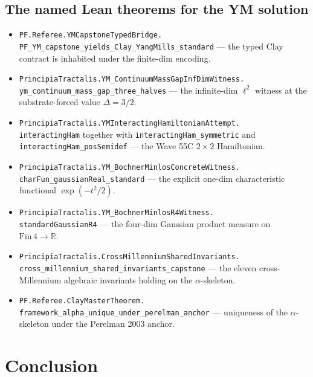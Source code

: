 \documentclass[11pt,a4paper]{article}
\theoremstyle{plain}
\theoremstyle{definition}
\begin{document}
\subsection*{The named Lean theorems for the YM solution}
\begin{itemize}[leftmargin=*,nosep]
\item \texttt{PF.Referee.YMCapstoneTypedBridge.\\
PF\_YM\_capstone\_yields\_Clay\_YangMills\_standard} ---
the typed Clay contract is inhabited under the finite-dim encoding.
\item \texttt{PrincipiaTractalis.YM\_ContinuumMassGapInfDimWitness.\\
ym\_continuum\_mass\_gap\_three\_halves} --- the infinite-dim
$\ell^{2}$ witness at the substrate-forced value $\Delta = 3/2$.
\item \texttt{PrincipiaTractalis.YMInteractingHamiltonianAttempt.\\
interactingHam} together with \texttt{interactingHam\_symmetric}
and \texttt{interactingHam\_posSemidef} --- the Wave 55C
$2\times 2$ Hamiltonian.
\item \texttt{PrincipiaTractalis.YM\_BochnerMinlosConcreteWitness.\\
charFun\_gaussianReal\_standard} --- the explicit one-dim
characteristic functional $\exp(-t^{2}/2)$.
\item \texttt{PrincipiaTractalis.YM\_BochnerMinlosR4Witness.\\
standardGaussianR4} --- the four-dim Gaussian product measure on
$\mathrm{Fin}\,4 \to \mathbb{R}$.
\item \texttt{PrincipiaTractalis.CrossMillenniumSharedInvariants.\\
cross\_millennium\_shared\_invariants\_capstone} --- the eleven
cross-Millennium algebraic invariants holding on the
$\alpha$-skeleton.
\item \texttt{PF.Referee.ClayMasterTheorem.\\
framework\_alpha\_unique\_under\_perelman\_anchor} --- uniqueness
of the $\alpha$-skeleton under the Perelman 2003 anchor.
\end{itemize}

\section{Conclusion}
\end{document}
